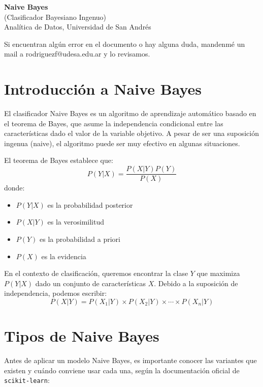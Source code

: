 \documentclass[12pt]{article}
\begin{document}
\begin{center}
  {\LARGE \textbf{Naive Bayes}}\\[0.5em]
  {\normalsize (Clasificador Bayesiano Ingenuo)}\\[0.5em]
  {Analítica de Datos, Universidad de San Andrés}
\end{center}

Si encuentran algún error en el documento o hay alguna duda, mandenmé un mail a rodriguezf@udesa.edu.ar y lo revisamos.

\section{Introducción a Naive Bayes}
El clasificador Naive Bayes es un algoritmo de aprendizaje automático basado en el teorema de Bayes, que asume la independencia condicional entre las características dado el valor de la variable objetivo. A pesar de ser una suposición ingenua (naive), el algoritmo puede ser muy efectivo en algunas situaciones.

\vspace{1em}

El teorema de Bayes establece que:
\[
P(Y|X) = \frac{P(X|Y)P(Y)}{P(X)}
\]
donde:
\begin{itemize}
    \item $P(Y|X)$ es la probabilidad posterior
    \item $P(X|Y)$ es la verosimilitud
    \item $P(Y)$ es la probabilidad a priori
    \item $P(X)$ es la evidencia
\end{itemize}

\vspace{1em}

En el contexto de clasificación, queremos encontrar la clase $Y$ que maximiza $P(Y|X)$ dado un conjunto de características $X$. Debido a la suposición de independencia, podemos escribir:
\[
P(X|Y) = P(X_1|Y) \times P(X_2|Y) \times \cdots \times P(X_n|Y)
\]

\section{Tipos de Naive Bayes}
Antes de aplicar un modelo Naive Bayes, es importante conocer las variantes que existen y cuándo conviene usar cada una, según la documentación oficial de \texttt{scikit-learn}:
\end{document}
